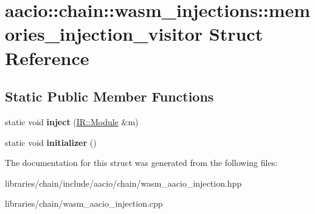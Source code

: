 \hypertarget{structaacio_1_1chain_1_1wasm__injections_1_1memories__injection__visitor}{}\section{aacio\+:\+:chain\+:\+:wasm\+\_\+injections\+:\+:memories\+\_\+injection\+\_\+visitor Struct Reference}
\label{structaacio_1_1chain_1_1wasm__injections_1_1memories__injection__visitor}
\subsection*{Static Public Member Functions}
\begin{DoxyCompactItemize}
\item 
\mbox{\label{structaacio_1_1chain_1_1wasm__injections_1_1memories__injection__visitor_a062272556621c44bebb564c4e63bc2e6}} 
static void {\bfseries inject} (\mbox{\hyperlink{struct_i_r_1_1_module}{I\+R\+::\+Module}} \&m)
\item 
\mbox{\label{structaacio_1_1chain_1_1wasm__injections_1_1memories__injection__visitor_a5fea3f007f54f6ab51a81b02d0ff3e44}} 
static void {\bfseries initializer} ()
\end{DoxyCompactItemize}


The documentation for this struct was generated from the following files\+:\begin{DoxyCompactItemize}
\item 
libraries/chain/include/aacio/chain/wasm\+\_\+aacio\+\_\+injection.\+hpp\item 
libraries/chain/wasm\+\_\+aacio\+\_\+injection.\+cpp\end{DoxyCompactItemize}
